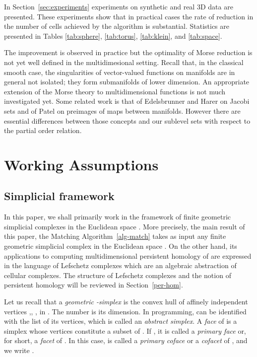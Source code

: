 \documentclass[12pt]{article}
\begin{document}
In Section~\ref{sec:experiments} experiments on synthetic and real 3D data are presented. These experiments show that in practical cases the rate of reduction in the number of cells achieved by the algorithm is substantial. Statistics are presented in Tables \ref{tab:sphere}, \ref{tab:torus}, \ref{tab:klein}, and \ref{tab:space}.

The improvement is observed in practice but the optimality of Morse reduction is not yet well defined in the multidimesional setting. Recall that, in the classical smooth case, the singularities of vector-valued functions on manifolds are in general not isolated; they form submanifolds of lower dimension. An appropriate extension of the Morse theory to multidimensional functions is not much investigated yet. Some related work is that of Edelsbrunner and Harer \cite{EdHa02} on Jacobi sets and of Patel \cite{Pat10} on preimages of maps between manifolds. However there are essential differences between those concepts and our sublevel sets with respect to the partial order relation.

\section{Working Assumptions}\label{sec:prel}


\subsection{Simplicial framework}\label{sec:simpl}

In this paper, we shall primarily work in the framework of finite geometric simplicial complexes  in the Euclidean space . More precisely, the main result of this paper, the Matching Algorithm~\ref{alg-match} takes as input any finite geometric simplicial complex  in the Euclidean space . On the other hand, its applications to computing multidimensional persistent homology of  are expressed in the language of Lefschetz complexes which are an algebraic abstraction of cellular complexes. The structure of Lefschetz complexes and the notion of persistent homology will be reviewed in Section~\ref{per-hom}.

Let us recall that a {\em  geometric -simplex}  is the convex hull of  affinely independent vertices ,, ,  in . The number  is its dimension. In programming,  can be identified with the list of its vertices, which is called an {\em abstract simplex}. A {\em face} of  is a simplex  whose vertices constitute a subset of . If , it is called a {\em primary face} or, for short, a {\em facet} of . In this case,  is called a {\em primary coface} or a {\em cofacet} of , and we write .
\end{document}
